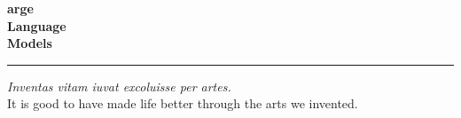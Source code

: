 \documentclass[11pt,a4paper,oneside,openany]{book}
\begin{document}
\frontmatter

\hypersetup{pageanchor=false}
\begin{titlepage}
  \centering
  \vspace*{0.22\textheight}
  {\headfont\bfseries\fontsize{34}{44}arge\\{\color{thmcolor}L}anguage\\{\color{thmcolor}M}odels\par}
  \vspace{14pt}
  {\color{thmcolor}\rule{0.35\textwidth}{1.2pt}\par}
  \vspace{12pt}
  {\Large\itshape \booksubtitle\par}
  \vfill
  {\large \bookauthor\par}
  \vspace{6pt}
  {\fontsize{10.5}{13}\selectfont\color{muted}\textit{Inventas vitam iuvat excoluisse per artes.}\\It is good to have made life better through the arts we invented.\par}
  \vspace{4pt}
\end{titlepage}
\hypersetup{pageanchor=true}

{\hypersetup{linkcolor=ink}\tableofcontents}



\mainmatter

\backmatter
\end{document}
